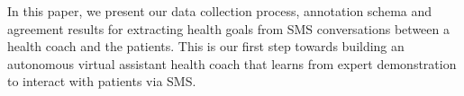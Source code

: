 In this paper, we present our data collection process, annotation schema and agreement results for extracting health goals from SMS conversations between a health coach and the patients. This is our first step towards building an autonomous virtual assistant health coach that learns from expert demonstration to interact with patients via SMS.

